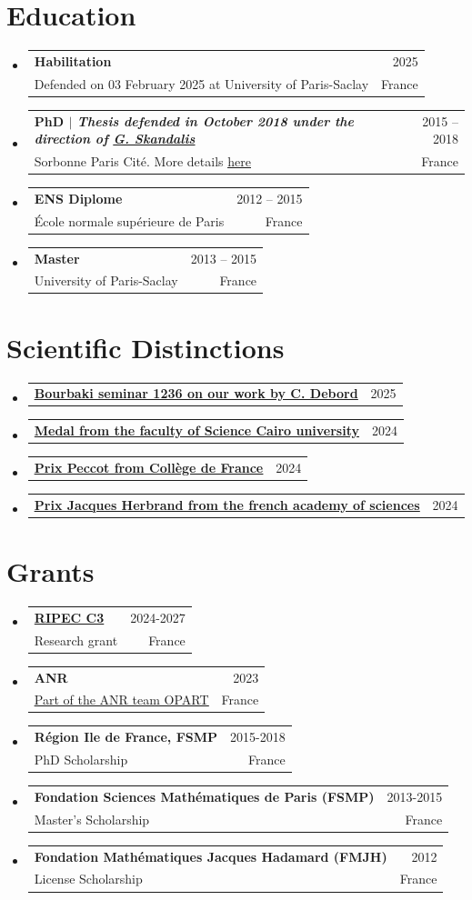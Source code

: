 \documentclass[A4,11pt]{article}
\makeatletter
\newcommand{\CVSubheading}[4]{
  \vspace{-2pt}\item
    \begin{tabular*}{0.97\textwidth}[t]{l@{\extracolsep{\fill}}r}
      \textbf{#1} & #2 \\
      \small#3 & \small #4 \\
    \end{tabular*}\vspace{-7pt}
}
\newcommand{\CVSubheadingshort}[2]{
  \vspace{-2pt}\item
    \begin{tabular*}{0.97\textwidth}[t]{l@{\extracolsep{\fill}}r}
      \textbf{#1} & #2 \\
    \end{tabular*}\vspace{-7pt}
}
\newcommand{\CVSubHeadingListStart}{\begin{itemize}[leftmargin=0.5cm, label={}]}
\newcommand{\CVSubHeadingListEnd}{\end{itemize}}
\makeatother
\begin{document}
\section{Education}
  \CVSubHeadingListStart
   \CVSubheading
      {Habilitation}{2025}
      {Defended on 03 February 2025 at University of Paris-Saclay}{France}
    \CVSubheading
      {{PhD $|$ \emph{\small{Thesis defended in October 2018 under the direction of \href{https://webusers.imj-prg.fr/~georges.skandalis/}{\underline{G. Skandalis}}}}}}{2015 -- 2018}
      {Sorbonne Paris Cité. More details \href{https://theses.fr/2018USPCC200}{\underline{here}}}{France}
    \CVSubheading
      {{ENS Diplome}}{2012 -- 2015}
      {École normale supérieure de Paris}{France}
    \CVSubheading
      {Master}{2013 -- 2015}
      {University of Paris-Saclay}{France}
  \CVSubHeadingListEnd
  \section{Scientific Distinctions}
\CVSubHeadingListStart
\CVSubheadingshort{\href{https://www.bourbaki.fr/TEXTES/Exp1236-Debord.pdf}{\underline{Bourbaki seminar 1236 on our work by C. Debord}}}{2025}{}{}
\CVSubheadingshort{\href{}{Medal from the faculty of Science Cairo university}}{2024}{}{}
\CVSubheadingshort{\href{https://www.college-de-france.fr/fr/personne/omar-mohsen}{\underline{Prix Peccot from Collège de France}}}{2024}{}{}
   \CVSubheadingshort{\href{https://www.insmi.cnrs.fr/en/cnrsinfo/prix-academie-des-sciences-2024-mathematiques}{\underline{Prix Jacques Herbrand from the french academy of sciences}}}{2024}{}{}
\CVSubHeadingListEnd
 
\section{Grants}
  \CVSubHeadingListStart
  \CVSubheading
{\href{}{RIPEC C3}}{2024-2027}{Research grant}{France}
\CVSubheading
{ANR}{2023}
{\href{https://anr.fr/Project-ANR-23-CE40-0016}{\underline{Part of the ANR team OPART}}}{France}
    \CVSubheading
      {Région Ile de France, FSMP}{2015-2018}
      {PhD Scholarship}{France}
      \CVSubheading
      {Fondation Sciences Mathématiques de Paris (FSMP)}{2013-2015}
      {Master's Scholarship}{France}
       \CVSubheading
      {Fondation Mathématiques Jacques Hadamard (FMJH)}{2012}
      {License Scholarship}{France}
  \CVSubHeadingListEnd
\end{document}
